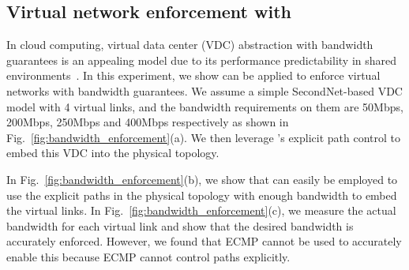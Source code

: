 \subsection{Virtual network enforcement with \sys}\label{subsec:vne}
%


In cloud computing, virtual data center (VDC) abstraction with bandwidth guarantees is an appealing model due to its performance predictability in shared environments~\cite{secondnet,oktopus,proteus2012}. In this experiment, we show \sys can be applied to enforce virtual networks with bandwidth guarantees. We assume a simple SecondNet-based VDC model with 4 virtual links, and the bandwidth requirements on them are 50Mbps, 200Mbps, 250Mbps and 400Mbps respectively as shown in Fig.~\ref{fig:bandwidth_enforcement}(a). We then leverage \sys's explicit path control to embed this VDC into the physical topology.

In Fig.~\ref{fig:bandwidth_enforcement}(b), we show that \sys can easily be employed to use the explicit paths in the physical topology with enough bandwidth to embed the virtual links. In Fig.~\ref{fig:bandwidth_enforcement}(c), we measure the actual bandwidth for each virtual link and show that the desired bandwidth is accurately enforced. However, we found that ECMP cannot be used to accurately enable this because ECMP cannot control paths explicitly.

